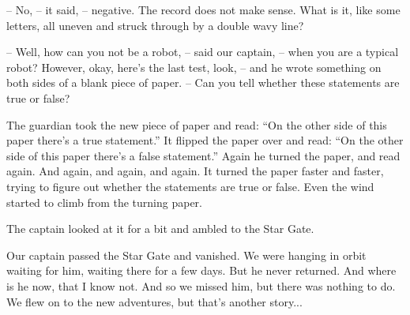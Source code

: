 \documentclass[ebook,oneside,final,openright]{memoir}
\begin{document}
– No, – it said, – negative. The record does not make sense. What is it, like some letters, all uneven and struck through by a double wavy line?\par
– Well, how can you not be a robot, – said our captain, – when you are a typical robot? However, okay, here’s the last test, look, – and he wrote something on both sides of a blank piece of paper. – Can you tell whether these statements are true or false?\par
\par
The guardian took the new piece of paper and read: “On the other side of this paper there’s a true statement.” It flipped the paper over and read: “On the other side of this paper there’s a false statement.” Again he turned the paper, and read again. And again, and again, and again. It turned the paper faster and faster, trying to figure out whether the statements are true or false. Even the wind started to climb from the turning paper.\par
\par
The captain looked at it for a bit and ambled to the Star Gate.\par
Our captain passed the Star Gate and vanished. We were hanging in orbit waiting for him, waiting there for a few days. But he never returned. And where is he now, that I know not. And so we missed him, but there was nothing to do. We flew on to the new adventures, but that’s another story...
\end{document}
